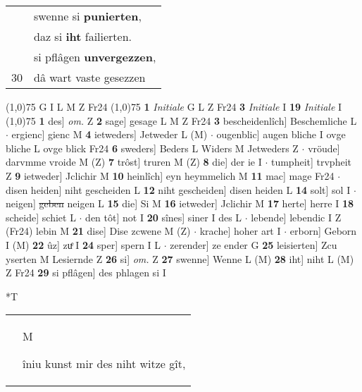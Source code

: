 \documentclass[8pt,a4paper,notitlepage]{article}
\begin{document}
\begin{table}[ht]
\begin{minipage}[t]{0.5\linewidth}
\begin{tabular}{rl}
 & swenne si \textbf{punierten},\\ 
 & daz si \textbf{iht} failierten.\\ 
 & si pflâgen \textbf{unvergezzen},\\ 
30 & dâ wart vaste gesezzen\\ 
\end{tabular}
\scriptsize
\line(1,0){75} \newline
G I L M Z Fr24 \newline
\line(1,0){75} \newline
\textbf{1} \textit{Initiale} G L Z Fr24  \textbf{3} \textit{Initiale} I  \textbf{19} \textit{Initiale} I  \newline
\line(1,0){75} \newline
\textbf{1} des] \textit{om.} Z \textbf{2} sage] gesage L M Z Fr24 \textbf{3} bescheidenlîch] Beschemliche L  $\cdot$ ergienc] gienc M \textbf{4} ietweders] Jetweder L (M)  $\cdot$ ougenblic] augen bliche I ovge bliche L ovge blick Fr24 \textbf{6} sweders] Beders L Widers M Jetweders Z  $\cdot$ vröude] darvmme vroide M (Z) \textbf{7} trôst] truren M (Z) \textbf{8} die] der ie I  $\cdot$ tumpheit] trvpheit Z \textbf{9} ietweder] Jclichir M \textbf{10} heinlîch] eyn heymmelich M \textbf{11} mac] mage Fr24  $\cdot$ disen heiden] niht gescheiden L \textbf{12} niht gescheiden] disen heiden L \textbf{14} solt] sol I  $\cdot$ neigen] \sout{geben} neigen L \textbf{15} die] Si M \textbf{16} ietweder] Jclichir M \textbf{17} herte] herre I \textbf{18} scheide] schiet L  $\cdot$ den tôt] not I \textbf{20} sînes] siner I des L  $\cdot$ lebende] lebendic I Z (Fr24) lebin M \textbf{21} dise] Dise zcwene M (Z)  $\cdot$ krache] hoher art I  $\cdot$ erborn] Geborn I (M) \textbf{22} ûz] zuͤ I \textbf{24} sper] spern I L  $\cdot$ zerender] ze ender G \textbf{25} leisierten] Zcu yserten M Lesiernde Z \textbf{26} si] \textit{om.} Z \textbf{27} swenne] Wenne L (M) \textbf{28} iht] niht L (M) Z Fr24 \textbf{29} si pflâgen] des phlagen si I \newline
\end{minipage}
\hspace{0.5cm}
\begin{minipage}[t]{0.5\linewidth}
\small
\begin{center}*T
\end{center}
\begin{tabular}{rl}
 & \begin{large}M\end{large}îniu kunst mir des niht witze gît,\\ 

\end{tabular}
\end{minipage}
\end{table}
\end{document}
